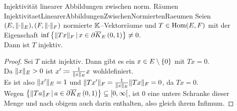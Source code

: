 \begin{lemma}{Injektivität linearer Abbildungen zwischen norm. Räumen}
             {InjektivitaetLinearerAbbildungenZwischenNormiertenRaeumen}
Seien $(E, \lVert\cdot\rVert_E), (F, \lVert\cdot\rVert_F)$ normierte $\mathbb{K}$--Vektorräume und
$T \in \mathop{\textrm{Hom}}\nolimits(E, F)$ mit der Eigenschaft
$\inf\left\{\lVert Tx\rVert_F\,|\,x \in \partial \overline K_{E}\left(0, 1\right)\right\} \neq 0$.\\
Dann ist $T$ injektiv.
\end{lemma}
\begin{proof}
Sei $T$ nicht injektiv. Dann gibt es ein $x\in E\setminus\left\{0\right\}$ mit $Tx=0$.\\
Da $\lVert x\rVert _E > 0$ ist $x' \coloneqq  \frac 1 {\lVert x\rVert_E}x$ wohldefiniert.\\
Es ist also $\lVert x'\rVert_E = 1$ und 
$\lVert Tx'\rVert_F = \frac 1 {\lVert x\rVert _E}\lVert Tx\rVert_F = 0$, da $Tx = 0$.\\
Wegen 
$\left\{\lVert Ta\rVert_F\,|\,a \in \partial \overline K_{E}\left(0, 1\right)\right\} \subseteq [0,\infty[$,
ist 0 eine untere Schranke dieser Menge und nach obigem auch darin
enthalten, also gleich ihrem Infimum.
\end{proof}
